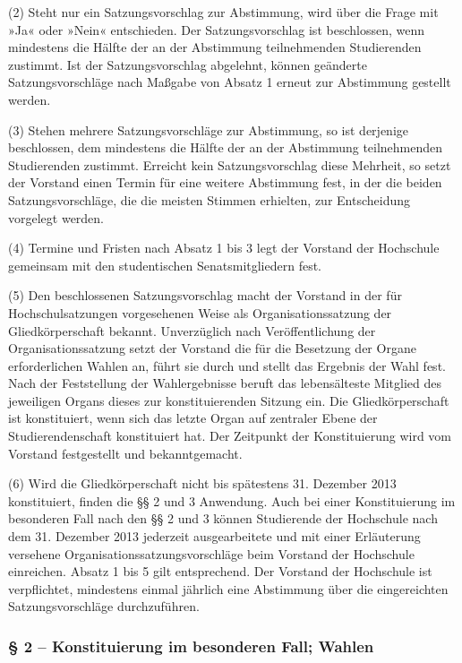 \documentclass[
10pt,
a4paper,
twoside,								%
titlepage=false,							%
draft=false								%
]{scrartcl}
\begin{document}
(2) Steht nur ein Satzungsvorschlag zur Abstimmung, wird über die Frage mit »Ja« oder »Nein« entschieden. Der Satzungsvorschlag ist beschlossen, wenn mindestens die Hälfte der an der Abstimmung teilnehmenden Studierenden zustimmt. Ist der Satzungsvorschlag abgelehnt, können geänderte Satzungsvorschläge nach Maßgabe von Absatz 1 erneut zur Abstimmung gestellt werden.

(3) Stehen mehrere Satzungsvorschläge zur Abstimmung, so ist derjenige beschlossen, dem mindestens die Hälfte der an der Abstimmung teilnehmenden Studierenden zustimmt. Erreicht kein Satzungsvorschlag diese Mehrheit, so setzt der Vorstand einen Termin für eine weitere Abstimmung fest, in der die beiden Satzungsvorschläge, die die meisten Stimmen erhielten, zur Entscheidung vorgelegt werden.

(4) Termine und Fristen nach Absatz 1 bis 3 legt der Vorstand der Hochschule gemeinsam mit den studentischen Senatsmitgliedern fest.

(5) Den beschlossenen Satzungsvorschlag macht der Vorstand in der für Hochschulsatzungen vorgesehenen Weise als Organisationssatzung der Gliedkörperschaft bekannt. Unverzüglich nach Veröffentlichung der Organisationssatzung setzt der Vorstand die für die Besetzung der Organe erforderlichen Wahlen an, führt sie durch und stellt das Ergebnis der Wahl fest. Nach der Feststellung der Wahlergebnisse beruft das lebensälteste Mitglied des jeweiligen Organs dieses zur konstituierenden Sitzung ein. Die Gliedkörperschaft ist konstituiert, wenn sich das letzte Organ auf zentraler Ebene der Studierendenschaft konstituiert hat. Der Zeitpunkt der Konstituierung wird vom Vorstand festgestellt und bekanntgemacht.

(6) Wird die Gliedkörperschaft nicht bis spätestens 31. Dezember 2013 konstituiert, finden die §§ 2 und 3 Anwendung. Auch bei einer Konstituierung im besonderen Fall nach den §§ 2 und 3 können Studierende der Hochschule nach dem 31. Dezember 2013 jederzeit ausgearbeitete und mit einer Erläuterung versehene Organisationssatzungsvorschläge beim Vorstand der Hochschule einreichen. Absatz 1 bis 5 gilt entsprechend. Der Vorstand der Hochschule ist verpflichtet, mindestens einmal jährlich eine Abstimmung über die eingereichten Satzungsvorschläge durchzuführen.


\subsubsection*{§ 2 – Konstituierung im besonderen Fall; Wahlen}
\end{document}
